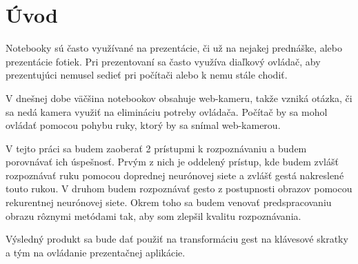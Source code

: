 {}
{}
\chapter*{Úvod}\label{chap:intro}
{\color{red}
Notebooky sú často využívané na prezentácie, či už na nejakej prednáške, alebo prezentácie fotiek. Pri prezentovaní sa často využíva diaľkový ovládač, aby prezentujúci nemusel sedieť pri počítači alebo k nemu stále chodiť.

V dnešnej dobe väčšina notebookov obsahuje web-kameru, takže vzniká otázka, či sa nedá kamera využiť na elimináciu potreby ovládača. Počítač by sa mohol ovládať pomocou pohybu ruky, ktorý by sa snímal web-kamerou.

V tejto práci sa budem zaoberať 2 prístupmi k rozpoznávaniu a budem porovnávať ich úspešnosť. Prvým z nich je oddelený prístup, kde budem zvlášť rozpoznávať ruku pomocou doprednej neurónovej siete a zvlášť gestá nakreslené touto rukou.
V druhom budem rozpoznávať gesto z postupnosti obrazov pomocou rekurentnej neurónovej siete. Okrem toho sa budem venovať predspracovaniu obrazu rôznymi metódami tak, aby som zlepšil kvalitu rozpoznávania.

Výsledný produkt sa bude dať použiť na transformáciu gest na klávesové skratky a tým na ovládanie prezentačnej aplikácie.
}

% 
% 
% 
% 
